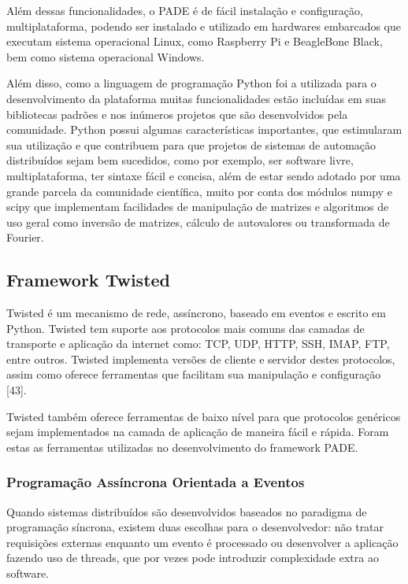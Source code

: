 \documentclass[journal]{IEEEtran}
\begin{document}
Além dessas funcionalidades, o PADE é de fácil instalação e configuração, multiplataforma, podendo ser instalado e utilizado em hardwares embarcados que executam sistema operacional Linux, como Raspberry Pi e BeagleBone Black, bem como sistema operacional Windows.

Além disso, como a linguagem de programação Python foi a utilizada para o desenvolvimento da plataforma muitas funcionalidades estão incluídas em suas bibliotecas padrões e nos inúmeros projetos que são desenvolvidos pela comunidade. Python possui algumas características importantes, que estimularam sua utilização e que contribuem para que projetos de sistemas de automação distribuídos sejam bem sucedidos, como por exemplo, ser software livre, multiplataforma, ter sintaxe fácil e concisa, além de estar sendo adotado por uma grande parcela da comunidade científica, muito por conta dos módulos numpy e scipy que implementam facilidades de manipulação de matrizes e algoritmos de uso geral como inversão de matrizes, cálculo de autovalores ou transformada de Fourier.

\subsection{Framework Twisted}

Twisted é um mecanismo de rede, assíncrono, baseado em eventos e escrito em Python. Twisted tem suporte aos protocolos mais comuns das camadas de transporte e aplicação da internet como: TCP, UDP, HTTP, SSH, IMAP, FTP, entre outros. Twisted implementa versões de cliente e servidor destes protocolos, assim como oferece ferramentas que facilitam sua manipulação e configuração [43].

Twisted também oferece ferramentas de baixo nível para que protocolos genéricos sejam implementados na camada de aplicação de maneira fácil e rápida. Foram estas as ferramentas utilizadas no desenvolvimento do framework PADE.

\subsubsection{Programação Assíncrona Orientada a Eventos} 

Quando sistemas distribuídos são desenvolvidos baseados no paradigma de programação síncrona, existem duas escolhas para o desenvolvedor: não tratar requisições externas enquanto um evento é processado ou desenvolver a aplicação fazendo uso de threads, que por vezes pode introduzir complexidade extra ao software.
\end{document}
